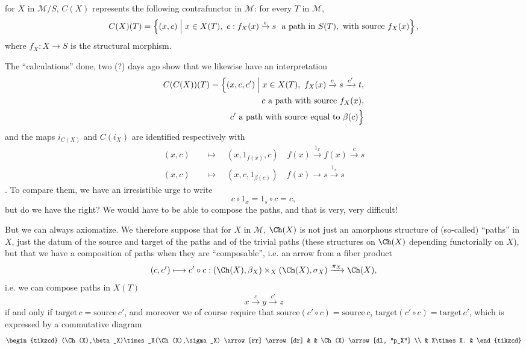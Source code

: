 for $X$ in $\mathcal{M}/S$, $C(X)$ represents the following contrafunctor in $\mathcal{M}$: for every $T$ in $\mathcal{M}$,
\[
C(X)(T)=\Bigl\{(x,c)\Bigm| x\in X(T),\ c : f_X(x)\xrightarrow{c}s\ \text{ a path in } S(T), \text{ with source } f_X(x)\Bigr\}\,,
\]
where $f_X : X\longrightarrow S$ is the structural morphism.

The ``calculations'' done, two (?) days ago show that we likewise have an interpretation
\[
\begin{aligned}
C(C(X))(T)=\Bigl\{(x,c,c')\Bigm| x\in X(T),\ f_X(x)\xrightarrow{c}s\xrightarrow{c'}t,\\
c\text{ a path with source } f_X(x),\\
c'\text{ a path with source equal to } \beta(c)\Bigr\}
\end{aligned}
\]
and the maps $i_{C(X)}$ and $C(i_X)$ are identified respectively with
\[
\begin{aligned}
(x,c)\quad&\longmapsto\quad(x,1_{f(x)},c)\quad f(x)\xrightarrow{1_x}f(x)\xrightarrow{c}s\\
(x,c)\quad&\longmapsto\quad(x,c,1_{\beta(c)})\quad f(x)\longrightarrow s\xrightarrow{1_s}s
\end{aligned}
\]
. To compare them, we have an irresistible urge to write
\[
c\circ 1_x=1_s\circ c=c,
\]
but do we have the right? We would have to be able to compose the paths, and that is very, very difficult!

But we can always axiomatize. We therefore suppose that for $X$ in $\mathcal{M}$, $\Ch(X)$
is not just an amorphous structure of (so-called) ``paths'' in $X$, just the datum of the source and target of the paths and of the trivial paths (these structures on $\Ch(X)$ depending functorially on $X$), but that we have a composition of paths when they are ``composable'', i.e. an arrow from a fiber product
\[
(c,c')\longmapsto c'\circ c : (\Ch(X),\beta_X)\times_X(\Ch(X),\sigma_X)\xrightarrow{\pi_X}\Ch(X),
\]
i.e. we can compose paths in $X(T)$
\[
x\xrightarrow{c}y\xrightarrow{c'}z
\]
if and only if $\text{target}\,c=\text{source}\,c'$, and moreover we of course require that $\text{source}(c'\circ c)=\text{source}\,c$, $\text{target}(c'\circ c)=\text{target}\,c'$, which is expressed by a commutative diagram
\[
\begin{tikzcd}
(\Ch(X),\beta_X)\times_X(\Ch(X),\sigma_X) \arrow[rr] \arrow[dr] & & \Ch(X) \arrow[dl, "p_X"] \\
 & X\times X. &
\end{tikzcd}
\]


